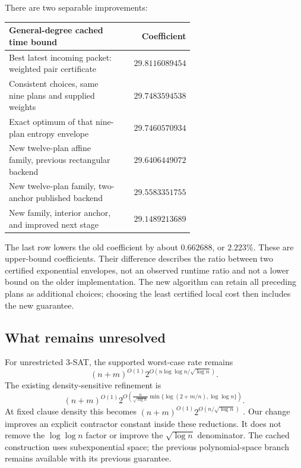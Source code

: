 There are two separable improvements:

\begin{center}
\begin{tabular}{@{}p{0.62\linewidth}r@{}}
\toprule
General-degree cached time bound & Coefficient\\
\midrule
Best latest incoming packet: weighted pair certificate & \(29.8116089454\)\\
Consistent choices, same nine plans and supplied weights & \(29.7483594538\)\\
Exact optimum of that nine-plan entropy envelope & \(29.7460570934\)\\
New twelve-plan affine family, previous rectangular backend & \(29.6406449072\)\\
New twelve-plan family, two-anchor published backend & \(29.5583351755\)\\
New family, interior anchor, and improved next stage & \(\mathbf{29.1489213689}\)\\
\bottomrule
\end{tabular}
\end{center}

The last row lowers the old coefficient by about \(0.662688\), or
\(2.223\%\). These are upper-bound coefficients. Their difference describes
the ratio between two certified exponential envelopes, not an observed
runtime ratio and not a lower bound on the older implementation.
The new algorithm can retain all preceding plans as additional choices;
choosing the least certified local cost then includes the new guarantee.

\subsection{What remains unresolved}

For unrestricted 3-SAT, the supported worst-case rate remains
\begin{equation}\label{eq:satrate}
 (n+m)^{O(1)}
 2^{O(n\log\log n/\sqrt{\log n})}.
\end{equation}
The existing density-sensitive refinement is
\begin{equation}\label{eq:density}
 (n+m)^{O(1)}
 2^{O\left(\frac{n}{\sqrt{\log n}}
       \min\{\log(2+m/n),\log\log n\}\right)}.
\end{equation}
At fixed clause density this becomes
\((n+m)^{O(1)}2^{O(n/\sqrt{\log n})}\)
\cite{source,density,density2}.
Our change improves an explicit contractor constant inside these
reductions. It does not remove the \(\log\log n\) factor or improve the
\(\sqrt{\log n}\) denominator. The cached construction uses subexponential
space; the previous polynomial-space branch remains available with its
previous guarantee.

